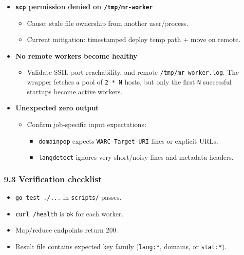 \documentclass[
]{article}
\providecommand{\tightlist}{%
  \setlength{\itemsep}{0pt}\setlength{\parskip}{0pt}}
\begin{document}
\begin{itemize}
\tightlist
\item
  \textbf{\texttt{scp} permission denied on \texttt{/tmp/mr-worker}}

  \begin{itemize}
  \tightlist
  \item
    Cause: stale file ownership from another user/process.
  \item
    Current mitigation: timestamped deploy temp path + move on remote.
  \end{itemize}
\item
  \textbf{No remote workers become healthy}

  \begin{itemize}
  \tightlist
  \item
    Validate SSH, port reachability, and remote
    \texttt{/tmp/mr-worker.log}. The wrapper fetches a pool of
    \texttt{2\ *\ N} hosts, but only the first \texttt{N} successful
    startups become active workers.
  \end{itemize}
\item
  \textbf{Unexpected zero output}

  \begin{itemize}
  \tightlist
  \item
    Confirm job-specific input expectations:

    \begin{itemize}
    \tightlist
    \item
      \texttt{domainpop} expects \texttt{WARC-Target-URI} lines or
      explicit URLs.
    \item
      \texttt{langdetect} ignores very short/noisy lines and metadata
      headers.
    \end{itemize}
  \end{itemize}
\end{itemize}

\subsubsection{9.3 Verification checklist}\label{verification-checklist}

\begin{itemize}
\tightlist
\item
  \texttt{go\ test\ ./...} in \texttt{scripts/} passes.
\item
  \texttt{curl\ /health} is \texttt{ok} for each worker.
\item
  Map/reduce endpoints return 200.
\item
  Result file contains expected key family (\texttt{lang:*}, domains, or
  \texttt{stat:*}).
\end{itemize}
\end{document}
